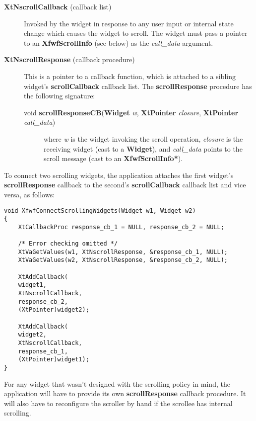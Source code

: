 \begin{description}

\item[{\rm {\bf XtNscrollCallback}\/ (callback list)}]

Invoked by the widget in response to any user input or
internal state change which causes the widget to scroll.  The
widget must pass a pointer to an {\bf XfwfScrollInfo} (see below) as
the {\it call\_data}\/ argument.

\item[{\rm {\bf XtNscrollResponse}\/ (callback procedure)}]

This is a pointer to a callback function, which is attached to
a sibling widget's {\bf scrollCallback} callback list.  The
{\bf scrollResponse} procedure has the following signature:

\begin{description}

\item[{\rm void {\bf scrollResponseCB}({\bf Widget} {\it w}\/, {\bf XtPointer} {\it closure}\/, {\bf XtPointer} {\it call\_data}\/)}]

where {\it w}\/ is the widget invoking the scroll operation,
{\it closure}\/ is the receiving widget (cast to a {\bf Widget}),
and {\it call\_data}\/ points to the scroll message (cast to
an {\bf XfwfScrollInfo*}).

\end{description}

\end{description}

To connect two scrolling widgets, the application attaches the first
widget's {\bf scrollResponse} callback to the second's {\bf scrollCallback}
callback list and vice versa, as follows:

\begin{verbatim}
void XfwfConnectScrollingWidgets(Widget w1, Widget w2)
{
    XtCallbackProc response_cb_1 = NULL, response_cb_2 = NULL;

    /* Error checking omitted */
    XtVaGetValues(w1, XtNscrollResponse, &response_cb_1, NULL);
    XtVaGetValues(w2, XtNscrollResponse, &response_cb_2, NULL);

    XtAddCallback(
	widget1,
	XtNscrollCallback,
	response_cb_2,
	(XtPointer)widget2);

    XtAddCallback(
	widget2,
	XtNscrollCallback,
	response_cb_1,
	(XtPointer)widget1);
}
\end{verbatim}

For any widget that wasn't designed with the scrolling policy in mind,
the application will have to provide its own {\bf scrollResponse} callback
procedure.  It will also have to reconfigure the scroller by hand if
the scrollee has internal scrolling.

